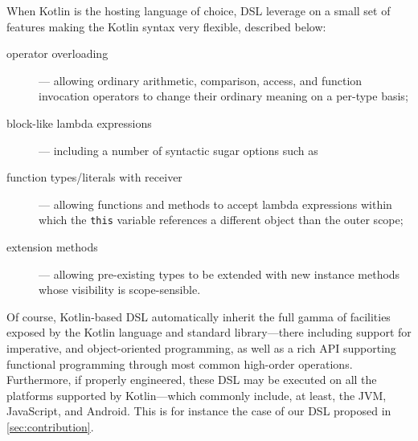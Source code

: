 \documentclass[12pt,a4paper,openright,twoside]{book}
\begin{document}
When Kotlin is the hosting language of choice, DSL leverage on a small set of features making the Kotlin syntax very flexible, described below:
%
\begin{description}
    \item[operator overloading\footnotemark] --- allowing ordinary arithmetic, comparison, access, and function invocation operators to change their ordinary meaning on a per-type basis;


    \item[block-like lambda expressions\footnotemark] --- including a number of syntactic sugar options such as


    \item[function types/literals with receiver] --- allowing functions and methods to accept lambda expressions within which the \texttt{this} variable references a different object than the outer scope;

    \item[extension methods\footnotemark] --- allowing pre-existing types to be extended with new instance methods whose visibility is scope-sensible.

\end{description}
%
Of course, Kotlin-based DSL automatically inherit the full gamma of facilities exposed by the Kotlin language and standard library---there including support for imperative, and object-oriented programming, as well as a rich API supporting functional programming through most common high-order operations.
%
Furthermore, if properly engineered, these DSL may be executed on all the platforms supported by Kotlin---which commonly include, at least, the JVM, JavaScript, and Android.
%
This is for instance the case of our DSL proposed in \cref{sec:contribution}.
\end{document}
